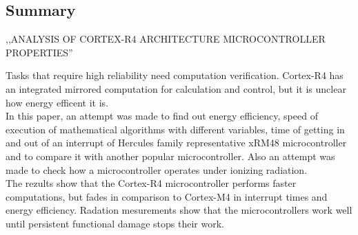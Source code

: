 \documentclass[a4paper, 12pt]{article} %
\newcommand{\studentas}{Mindaugas Kurmauskas} %
\begin{document}
\begin{onehalfspacing}

\section*{Summary}


\begin{center}


\MakeUppercase{,,Analysis of Cortex-R4 Architecture Microcontroller Properties''}\\


\end{center}

Tasks that require high reliability need computation verification. Cortex-R4 has an integrated mirrored computation for calculation and control, but it is unclear how energy efficent it is. \\
\indent In this paper, an attempt was made to find out energy efficiency, speed of execution of mathematical algorithms with different variables, time of getting in and out of an interrupt of Hercules family representative xRM48 microcontroller and to compare it with another popular microcontroller. Also an attempt was made to check how a microcontroller operates under ionizing radiation. \\
\indent
The rezults show that the Cortex-R4 microcontroller performs faster computations, but fades in comparison to Cortex-M4 in interrupt times and energy efficiency. Radation mesurements show that the microcontrollers work well until persistent functional damage stops their work.

\end{onehalfspacing}
\end{document}
